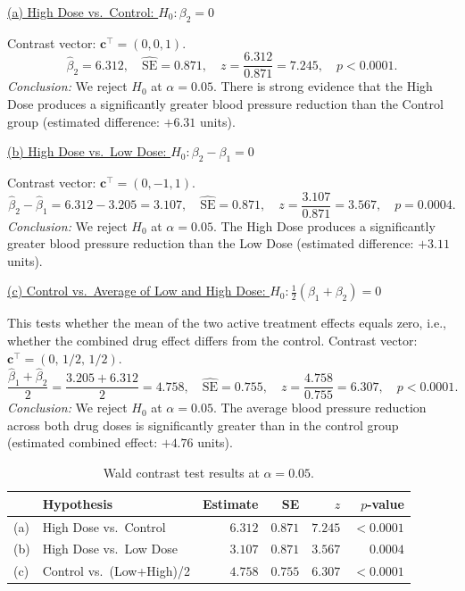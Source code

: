 \documentclass[letterpaper]{article}
\begin{document}
			\underline{(a) High Dose vs.\ Control: $H_0: \beta_2 = 0$}
			
			Contrast vector: $\mathbf{c}^\top = (0, 0, 1)$.
			\[
			\hat{\beta}_2 = 6.312, \quad
			\widehat{\text{SE}} = 0.871, \quad
			z = \frac{6.312}{0.871} = 7.245, \quad
			p < 0.0001.
			\]
			\textit{Conclusion:} We reject $H_0$ at $\alpha = 0.05$. There is strong
			evidence that the High Dose produces a significantly greater blood pressure
			reduction than the Control group (estimated difference: $+6.31$ units).
			
			\underline{(b) High Dose vs.\ Low Dose: $H_0: \beta_2 - \beta_1 = 0$}
			
			Contrast vector: $\mathbf{c}^\top = (0, -1, 1)$.
			\[
			\hat{\beta}_2 - \hat{\beta}_1 = 6.312 - 3.205 = 3.107, \quad
			\widehat{\text{SE}} = 0.871, \quad
			z = \frac{3.107}{0.871} = 3.567, \quad
			p = 0.0004.
			\]
			\textit{Conclusion:} We reject $H_0$ at $\alpha = 0.05$. The High Dose
			produces a significantly greater blood pressure reduction than the Low Dose
			(estimated difference: $+3.11$ units).
			
			\underline{(c) Control vs.\ Average of Low and High Dose:
				$H_0: \tfrac{1}{2}(\beta_1 + \beta_2) = 0$}
			
			This tests whether the mean of the two active treatment effects equals zero,
			i.e., whether the combined drug effect differs from the control.
			Contrast vector: $\mathbf{c}^\top = (0,\, 1/2,\, 1/2)$.
			\[
			\frac{\hat{\beta}_1 + \hat{\beta}_2}{2}
			= \frac{3.205 + 6.312}{2} = 4.758, \quad
			\widehat{\text{SE}} = 0.755, \quad
			z = \frac{4.758}{0.755} = 6.307, \quad
			p < 0.0001.
			\]
			\textit{Conclusion:} We reject $H_0$ at $\alpha = 0.05$. The average blood
			pressure reduction across both drug doses is significantly greater than in
			the control group (estimated combined effect: $+4.76$ units).
			

			\begin{table}[H]
				\centering
				\begin{tabular}{llrrrr}
					\toprule
					& Hypothesis & Estimate & SE & $z$ & $p$-value \\
					\midrule
					(a) & High Dose vs.\ Control      & $6.312$ & $0.871$ & $7.245$ & $<0.0001$ \\
					(b) & High Dose vs.\ Low Dose     & $3.107$ & $0.871$ & $3.567$ & $0.0004$  \\
					(c) & Control vs.\ (Low+High)/2   & $4.758$ & $0.755$ & $6.307$ & $<0.0001$ \\
					\bottomrule
				\end{tabular}
				\caption{Wald contrast test results at $\alpha = 0.05$.}
			\end{table}
			
\end{document}
